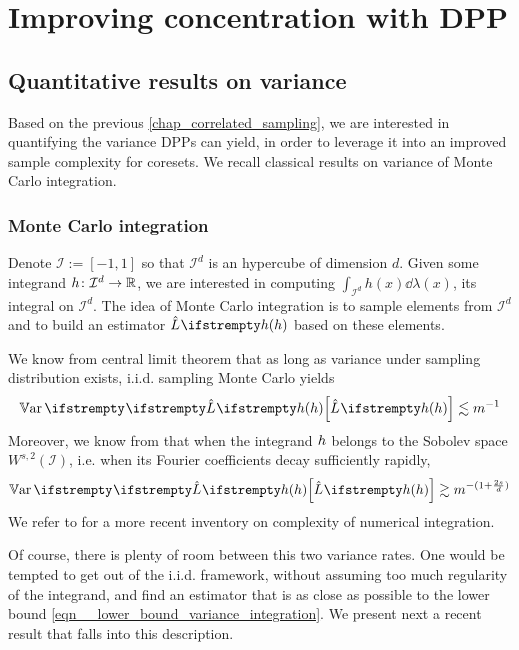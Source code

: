 

\chapter{Improving concentration with DPP}
\label{chap__improv_conc_dpp}


\section{Quantitative results on variance}
\label{sec__quant_result_variance}
Based on the previous \cref{chap_correlated_sampling}, we are interested in quantifying the variance DPPs can yield, in order to leverage it into an improved sample complexity for coresets. We recall classical results on variance of Monte Carlo integration.

\subsection{Monte Carlo integration}
Denote $\mathcal{I}:= [-1,1]$ so that $\mathcal{I}^d$ is an hypercube of dimension $d$. Given some integrand $h \colon \mathcal{I}^d \to \mathbb{R}$, we are interested in computing $\int_{\mathcal{I}^d} h(x) \dd \lambda(x)$, its integral on $\mathcal{I}^d$. The idea of Monte Carlo integration is to sample elements from $\mathcal{I}^d$ and to build an estimator $\estloss{}{\threequery}$ based on these elements.

We know from central limit theorem that as long as variance under sampling distribution exists, i.i.d. sampling Monte Carlo yields
\begin{equation}
	\Var{}{\estloss{}{\threequery}} \lesssim m^{-1}
\end{equation}
Moreover, we know from \cite{bakhvalov1959_approximate_calculation_integrals} that when the integrand $h$ belongs to the Sobolev space $W^{s,2}(\mathcal{I})$, i.e. when its Fourier coefficients decay sufficiently rapidly,
\begin{equation}
	\label{eqn__lower_bound_variance_integration}
	\Var{}{\estloss{}{\threequery}} \gtrsim m^{-(1+\frac{2s}{d})}
\end{equation}
We refer to \cite{novak2014_complexity_numerical_integration} for a more recent inventory on complexity of numerical integration. 

Of course, there is plenty of room between this two variance rates. One would be tempted to get out of the i.i.d. framework, without assuming too much regularity of the integrand, and find an estimator that is as close as possible to the lower bound \cref{eqn__lower_bound_variance_integration}. We present next a recent result that falls into this description.



